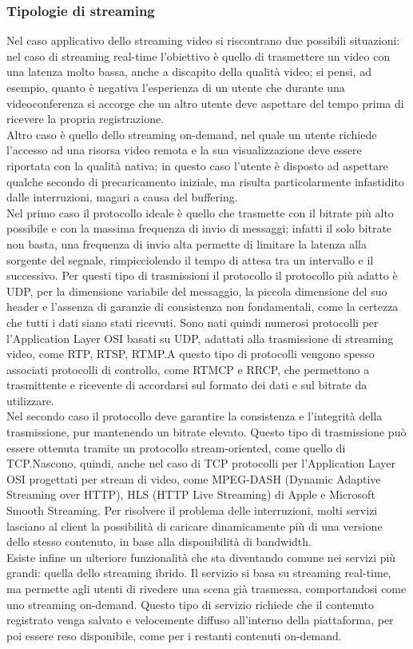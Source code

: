 			\subsubsection{Tipologie di streaming}
			Nel caso applicativo dello streaming video si riscontrano due possibili situazioni:
			nel caso di streaming real-time l'obiettivo è quello di trasmettere un video con una latenza molto bassa, anche a discapito della qualità video; si pensi, ad esempio, quanto è negativa l'esperienza di un utente che durante una videoconferenza si accorge che un altro utente deve aspettare del tempo prima di ricevere la propria registrazione.
			\\
			Altro caso è quello dello streaming on-demand, nel quale un utente richiede l'accesso ad una risorsa video remota e la sua visualizzazione deve essere riportata con la qualità nativa; in questo caso l'utente è disposto ad aspettare qualche secondo di precaricamento iniziale, ma risulta particolarmente infastidito dalle interruzioni, magari a causa del buffering.
			\\
			Nel primo caso il protocollo ideale è quello che trasmette con il bitrate più alto possibile e con la massima frequenza di invio di messaggi; infatti il solo bitrate non basta, una frequenza di invio alta permette di limitare la latenza alla sorgente del segnale, rimpicciolendo il tempo di attesa tra un intervallo e il successivo. Per questi tipo di trasmissioni il protocollo il protocollo più adatto è UDP, per la dimensione variabile del messaggio, la piccola dimensione del suo header e l'assenza di garanzie di consistenza non fondamentali, come la certezza che tutti i dati siano stati ricevuti. Sono nati quindi numerosi protocolli per l'Application Layer OSI basati su UDP, adattati alla trasmissione di streaming video, come RTP, RTSP, RTMP.\@ A questo tipo di protocolli vengono spesso associati protocolli di controllo, come RTMCP e RRCP, che permettono a trasmittente e ricevente di accordarsi sul formato dei dati e sul bitrate da utilizzare.
			\\
			Nel secondo caso il protocollo deve garantire la consistenza e l'integrità della trasmissione, pur mantenendo un bitrate elevato. Questo tipo di trasmissione può essere ottenuta tramite un protocollo stream-oriented, come quello di TCP.\@ Nascono, quindi, anche nel caso di TCP protocolli per l'Application Layer OSI progettati per stream di video, come MPEG-DASH (Dynamic Adaptive Streaming over HTTP), HLS (HTTP Live Streaming) di Apple e Microsoft Smooth Streaming. Per risolvere il problema delle interruzioni, molti servizi lasciano al client la possibilità di caricare dinamicamente più di una versione dello stesso contenuto, in base alla disponibilità di bandwidth.
			\\
			Esiste infine un ulteriore funzionalità che sta diventando comune nei servizi più grandi: quella dello streaming ibrido. Il servizio si basa su streaming real-time, ma permette agli utenti di rivedere una scena già trasmessa, comportandosi come uno streaming on-demand. Questo tipo di servizio richiede che il contenuto registrato venga salvato e velocemente diffuso all'interno della piattaforma, per poi essere reso disponibile, come per i restanti contenuti on-demand.

